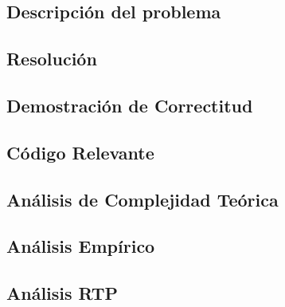 \subsection{Descripci\'on del problema}

\newpage

\subsection{Resoluci\'on}

\newpage

\subsection{Demostraci\'on de Correctitud}

\newpage

\subsection{C\'odigo Relevante}

\newpage

\subsection{Análisis de Complejidad Te\'orica}

\newpage

\subsection{Análisis Empírico}

\newpage

\subsection{Análisis RTP}

\newpage